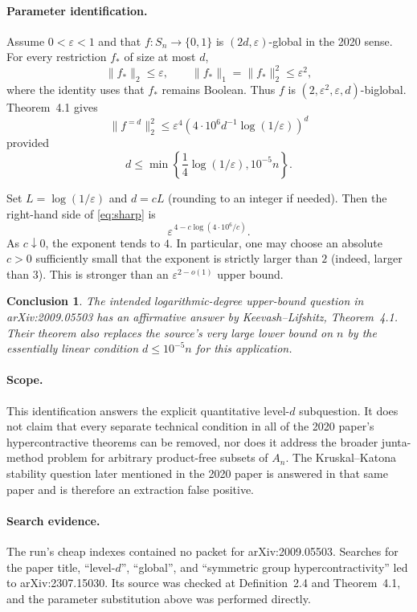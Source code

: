 \documentclass[11pt]{article}
\newtheorem*{claim}{Conclusion}
\begin{document}
\paragraph{Parameter identification.}
Assume $0<\varepsilon<1$ and that $f:S_n\to\{0,1\}$ is
$(2d,\varepsilon)$-global in the 2020 sense. For every restriction $f_*$ of
size at most $d$,
\[
 \lVert f_*\rVert_2\leq\varepsilon,
 \qquad
 \lVert f_*\rVert_1=\lVert f_*\rVert_2^2\leq\varepsilon^2,
\]
where the identity uses that $f_*$ remains Boolean. Thus $f$ is
$(2,\varepsilon^2,\varepsilon,d)$-biglobal. Theorem~4.1 gives
\begin{equation}\label{eq:sharp}
 \lVert f^{=d}\rVert_2^2
 \leq \varepsilon^4
 \left(4\cdot10^6d^{-1}\log(1/\varepsilon)\right)^d
\end{equation}
provided
\[
d\leq\min\left\{\frac14\log(1/\varepsilon),10^{-5}n\right\}.
\]

Set $L=\log(1/\varepsilon)$ and $d=cL$ (rounding to an integer if needed).
Then the right-hand side of \eqref{eq:sharp} is
\[
 \varepsilon^{\,4-c\log(4\cdot10^6/c)}.
\]
As $c\downarrow0$, the exponent tends to $4$. In particular, one may choose
an absolute $c>0$ sufficiently small that the exponent is strictly larger
than $2$ (indeed, larger than $3$). This is stronger than an
$\varepsilon^{2-o(1)}$ upper bound.

\begin{claim}
The intended logarithmic-degree upper-bound question in arXiv:2009.05503 has
an affirmative answer by Keevash--Lifshitz, Theorem~4.1. Their theorem also
replaces the source's very large lower bound on $n$ by the essentially linear
condition $d\leq10^{-5}n$ for this application.
\end{claim}

\paragraph{Scope.}
This identification answers the explicit quantitative level-$d$ subquestion.
It does not claim that every separate technical condition in all of the 2020
paper's hypercontractive theorems can be removed, nor does it address the
broader junta-method problem for arbitrary product-free subsets of $A_n$.
The Kruskal--Katona stability question later mentioned in the 2020 paper is
answered in that same paper and is therefore an extraction false positive.

\paragraph{Search evidence.}
The run's cheap indexes contained no packet for arXiv:2009.05503. Searches for
the paper title, ``level-$d$'', ``global'', and ``symmetric group
hypercontractivity'' led to arXiv:2307.15030. Its source was checked at
Definition~2.4 and Theorem~4.1, and the parameter substitution above was
performed directly.
\end{document}
